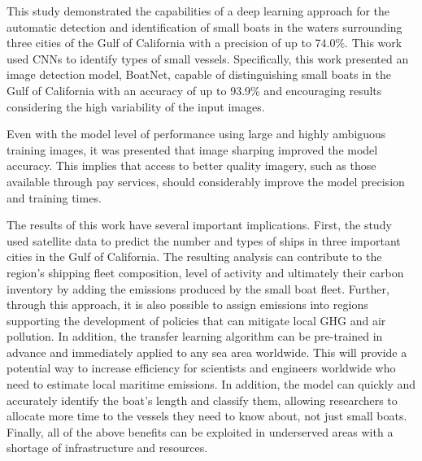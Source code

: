 
This study demonstrated the capabilities of a deep learning approach for the automatic detection and identification of small boats in the waters surrounding three cities of the Gulf of California with a precision of up to 74.0\%. This work used CNNs to identify types of small vessels. Specifically, this work presented an image detection model, BoatNet, capable of distinguishing small boats in the Gulf of California with an accuracy of up to 93.9\% and encouraging results considering the high variability of the input images.

Even with the model level of performance using large and highly ambiguous training images, it was presented that image sharping improved the model accuracy. This implies that access to better quality imagery, such as those available through pay services, should considerably improve the model precision and training times.

The results of this work have several important implications. First, the study used satellite data to predict the number and types of ships in three important cities in the Gulf of California. The resulting analysis can contribute to the region's shipping fleet composition, level of activity and ultimately their carbon inventory by adding the emissions produced by the small boat fleet. Further, through this approach, it is also possible to assign emissions into regions supporting the development of policies that can mitigate local GHG and air pollution. In addition, the transfer learning algorithm can be pre-trained in advance and immediately applied to any sea area worldwide. This will provide a potential way to increase efficiency for scientists and engineers worldwide who need to estimate local maritime emissions. In addition, the model can quickly and accurately identify the boat's length and classify them, allowing researchers to allocate more time to the vessels they need to know about, not just small boats. Finally, all of the above benefits can be exploited in underserved areas with a shortage of infrastructure and resources.

